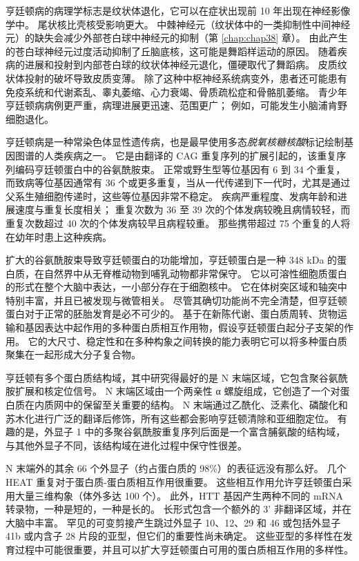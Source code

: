 亨廷顿病的病理学标志是纹状体退化，它可以在症状出现前 10 年出现在神经影像学中。
尾状核比壳核受影响更大。 中棘神经元（纹状体中的一类抑制性中间神经元）的缺失会减少外部苍白球中神经元的抑制（第 \ref{chap:chap38} 章）。
由此产生的苍白球神经元过度活动抑制了丘脑底核，这可能是舞蹈样运动的原因。
随着疾病的进展和投射到内部苍白球的纹状体神经元退化，僵硬取代了舞蹈病。
皮质纹状体投射的破坏导致皮质变薄。
除了这种中枢神经系统病变外，患者还可能患有免疫系统和代谢紊乱、睾丸萎缩、心力衰竭、骨质疏松症和骨骼肌萎缩。
青少年亨廷顿病病例更严重，病理进展更迅速、范围更广；
例如，可能发生小脑浦肯野细胞退化。


亨廷顿病是一种常染色体显性遗传病，也是最早使用多态\textit{脱氧核糖核酸}标记绘制基因图谱的人类疾病之一。
它是由翻译的 CAG 重复序列的扩展引起的，该重复序列编码亨廷顿蛋白中的谷氨酰胺束。
正常或野生型等位基因有 6 到 34 个重复，而致病等位基因通常有 36 个或更多重复，当从一代传递到下一代时，尤其是通过父系生殖细胞传递时，这些等位基因非常不稳定。
疾病严重程度、发病年龄和进展速度与重复长度相关；
重复次数为 36 至 39 次的个体发病较晚且病情较轻，而重复次数超过 40 次的个体发病较早且病程较重。
那些携带超过 75 个重复的人将在幼年时患上这种疾病。


扩大的谷氨酰胺束导致亨廷顿蛋白的功能增加，亨廷顿蛋白是一种 348 kDa 的蛋白质，在自然界中从无脊椎动物到哺乳动物都非常保守。
它以可溶性细胞质蛋白的形式在整个大脑中表达，一小部分存在于细胞核中。
它在体树突区域和轴突中特别丰富，并且已被发现与微管相关。
尽管其确切功能尚不完全清楚，但亨廷顿蛋白对于正常的胚胎发育是必不可少的。
基于在新陈代谢、蛋白质周转、货物运输和基因表达中起作用的多种蛋白质相互作用物，假设亨廷顿蛋白起分子支架的作用。
它的大尺寸、稳定性和在多种构象之间转换的能力表明它可以将多种蛋白质聚集在一起形成大分子复合物。


亨廷顿有多个蛋白质结构域，其中研究得最好的是 N 末端区域，它包含聚谷氨酰胺扩展和核定位信号。
N 末端区域由一个两亲性 α 螺旋组成，它创造了一个对蛋白质在内质网中的保留至关重要的结构。
N 末端通过乙酰化、泛素化、磷酸化和苏木化进行广泛的翻译后修饰，所有这些都会影响亨廷顿清除和亚细胞定位。
有趣的是，外显子 1 中的多聚谷氨酰胺重复序列后面是一个富含脯氨酸的结构域，与其他外显子不同，该结构域在进化过程中保守性很差。


N 末端外的其余 66 个外显子（约占蛋白质的 98\%）的表征远没有那么好。
几个 HEAT 重复对于蛋白质-蛋白质相互作用很重要。
这些相互作用允许亨廷顿蛋白采用大量三维构象（体外多达 100 个）。
此外，HTT 基因产生两种不同的 mRNA 转录物，一种是短的，一种是长的。
长形式包含一个额外的 3' 非翻译区域，并在大脑中丰富。
罕见的可变剪接产生跳过外显子 10、12、29 和 46 或包括外显子 41b 或内含子 28 片段的亚型，但它们的重要性尚未确定。
这些亚型的多样性在发育过程中可能很重要，并且可以扩大亨廷顿蛋白可用的蛋白质相互作用的多样性。



